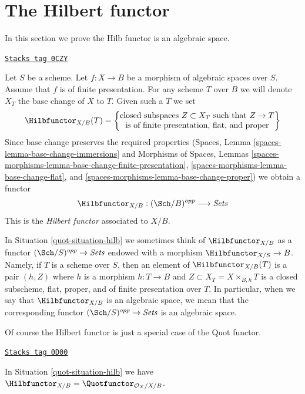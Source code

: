 \section{The Hilbert functor}
\label{quot-section-hilb}
In this section we prove the Hilb functor is an algebraic space.

\begin{definition}
\label{quot-situation-hilb}
\href{https://stacks.math.columbia.edu/tag/0CZY}{\texttt{Stacks tag 0CZY}}

Let $S$ be a scheme. Let $f : X \to B$ be a morphism of
algebraic spaces over $S$. Assume that $f$ is of finite presentation.
For any scheme $T$ over $B$ we will denote $X_T$ the base change of
$X$ to $T$. Given such a $T$ we set
$$
\Hilbfunctor_{X/B}(T) =
\left\{
\begin{matrix}
\text{closed subspaces }Z \subset X_T\text{ such that }Z \to T\\
\text{is of finite presentation, flat, and proper}
\end{matrix}
\right\}
$$
Since base change preserves the required properties
(Spaces, Lemma \ref{spaces-lemma-base-change-immersions} and
Morphisms of Spaces, Lemmas
\ref{spaces-morphisms-lemma-base-change-finite-presentation},
\ref{spaces-morphisms-lemma-base-change-flat}, and
\ref{spaces-morphisms-lemma-base-change-proper})
we obtain a functor
\begin{equation}
\label{equation-hilb}
\Hilbfunctor_{X/B} : (\Sch/B)^{opp} \longrightarrow \textit{Sets}
\end{equation}
This is the {\it Hilbert functor} associated to $X/B$.
\end{definition}

In Situation \ref{quot-situation-hilb} we sometimes think of $\Hilbfunctor_{X/B}$
as a functor $(\Sch/S)^{opp} \to \textit{Sets}$ endowed with a morphism
$\Hilbfunctor_{X/S} \to B$. Namely, if $T$ is a scheme over $S$, then an element
of $\Hilbfunctor_{X/B}(T)$ is a pair $(h, Z)$
where $h$ is a morphism $h : T \to B$
and $Z \subset X_T = X \times_{B, h} T$
is a closed subscheme, flat, proper, and of finite
presentation over $T$. In particular, when we say
that $\Hilbfunctor_{X/B}$ is an algebraic space, we mean that the
corresponding functor $(\Sch/S)^{opp} \to \textit{Sets}$ is an algebraic space.

\medskip\noindent
Of course the Hilbert functor is just a special case of the
Quot functor.

\begin{lemma}
\label{quot-lemma-hilb-is-quot}
\href{https://stacks.math.columbia.edu/tag/0D00}{\texttt{Stacks tag 0D00}}

In Situation \ref{quot-situation-hilb} we have
$\Hilbfunctor_{X/B} = \Quotfunctor_{\mathcal{O}_X/X/B}$.
\end{lemma}

